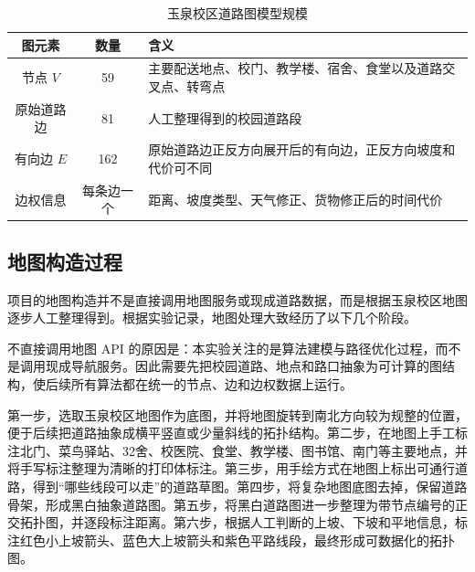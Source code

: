 \documentclass[12pt,a4paper,UTF8]{article}
\begin{document}
\begin{table}[H]
\centering
\caption{玉泉校区道路图模型规模}
\label{tab:graph_scale}
\small
\renewcommand{\arraystretch}{1.2}
\begin{tabularx}{0.88\textwidth}{c|c|X}
\hline
图元素 & 数量 & 含义 \\
\hline
节点 $V$ & 59 & 主要配送地点、校门、教学楼、宿舍、食堂以及道路交叉点、转弯点 \\
\hline
原始道路边 & 81 & 人工整理得到的校园道路段 \\
\hline
有向边 $E$ & 162 & 原始道路边正反方向展开后的有向边，正反方向坡度和代价可不同 \\
\hline
边权信息 & 每条边一个 & 距离、坡度类型、天气修正、货物修正后的时间代价 \\
\hline
\end{tabularx}
\end{table}

\subsection{地图构造过程}

项目的地图构造并不是直接调用地图服务或现成道路数据，而是根据玉泉校区地图逐步人工整理得到。根据实验记录，地图处理大致经历了以下几个阶段。

不直接调用地图 API 的原因是：本实验关注的是算法建模与路径优化过程，而不是调用现成导航服务。因此需要先把校园道路、地点和路口抽象为可计算的图结构，使后续所有算法都在统一的节点、边和边权数据上运行。

第一步，选取玉泉校区地图作为底图，并将地图旋转到南北方向较为规整的位置，便于后续把道路抽象成横平竖直或少量斜线的拓扑结构。第二步，在地图上手工标注北门、菜鸟驿站、32舍、校医院、食堂、教学楼、图书馆、南门等主要地点，并将手写标注整理为清晰的打印体标注。第三步，用手绘方式在地图上标出可通行道路，得到“哪些线段可以走”的道路草图。第四步，将复杂地图底图去掉，保留道路骨架，形成黑白抽象道路图。第五步，将黑白道路图进一步整理为带节点编号的正交拓扑图，并逐段标注距离。第六步，根据人工判断的上坡、下坡和平地信息，标注红色小上坡箭头、蓝色大上坡箭头和紫色平路线段，最终形成可数据化的拓扑图。
\end{document}
